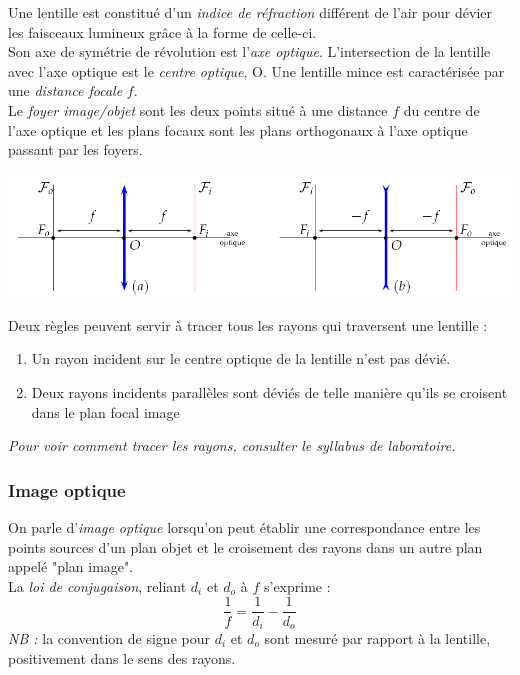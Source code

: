 \documentclass	[11pt, a4paper, openany]{book}
\begin{document}
		Une lentille est constitué d'un \textit{indice de réfraction} différent de l'air pour dévier les faisceaux lumineux grâce à la forme de celle-ci.\\
		
		Son axe de symétrie de révolution est l'\textit{axe optique}. L'intersection de la lentille avec l'axe optique est le \textit{centre optique}, O. Une lentille mince est caractérisée par une \textit{distance focale} $f$.\\
		Le \textit{foyer image/objet} sont les deux points situé à une distance $f$ du centre de l'axe optique et les plans focaux sont les plans orthogonaux à l'axe optique passant par les foyers.
		\begin{center}
			\includegraphics[scale=0.6]{labo/image28.png}
		\end{center}
		Deux règles peuvent servir à tracer tous les rayons qui traversent une lentille : 
		\begin{enumerate}
			\item Un rayon incident sur le centre optique de la lentille n'est pas dévié.
			\item Deux rayons incidents parallèles sont déviés de telle manière qu'ils se croisent dans
			      le plan focal image
		\end{enumerate}
		\textit{Pour voir comment tracer les rayons, consulter le syllabus de laboratoire.}
		
		\subsubsection*{Image optique}
		On parle d'\textit{image optique} lorsqu'on peut établir une correspondance entre les points sources d'un plan objet et le croisement des rayons dans un autre plan appelé "plan image".\\
		La \textit{loi de conjugaison}, reliant $d_i$ et $d_o$ à $f$ s'exprime : 
		\begin{equation}
			\frac{1}{f} = \frac{1}{d_i} - \frac{1}{d_o}
		\end{equation}
		\textit{NB :} la convention de signe pour $d_i$ et $d_o$ sont mesuré par rapport à la lentille, positivement dans le sens des rayons.\\
		
\end{document}
